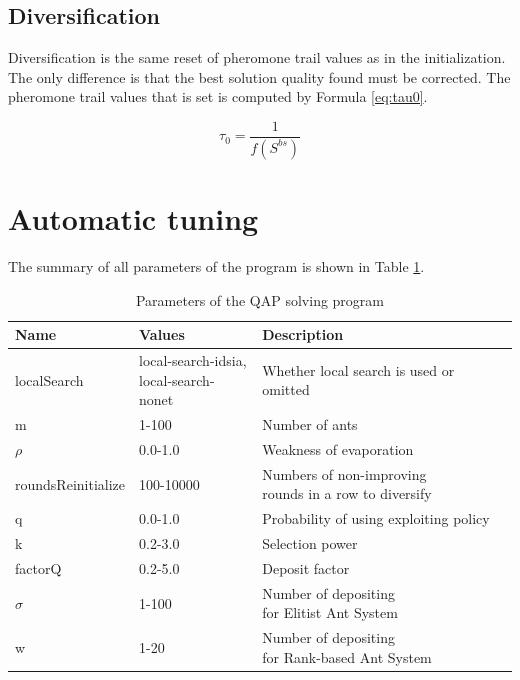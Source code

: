 \documentclass[12pt]{article}
\begin{document}
\subsection{Diversification}

Diversification is the same reset of pheromone trail values as in the initialization. The only difference is that the best solution quality found must be corrected. The pheromone trail values that is set is computed by Formula \ref{eq:tau0}.

\begin{equation}
\tau_0=\frac{1}{f(S^{bs})}
\label{eq:tau0}
\end{equation}

\section{Automatic tuning}

The summary of all parameters of the program is shown in Table \ref{tbl:parameters}.

\begin{table}[H]
\centering
\caption{Parameters of the QAP solving program}
\label{tbl:parameters}
\begin{tabular}{|l|l|l|}
\hline
\textbf{Name}         & \textbf{Values}                       & \textbf{Description}                                  \\ \hline
localSearch           & \makecell{local-search-idsia,\\ local-search-nonet} & Whether local search is used or omitted               \\ \hline
m                     & 1-100                                 & Number of ants                                        \\ \hline
$\rho$   & 0.0-1.0                               & Weakness of evaporation                               \\ \hline
roundsReinitialize    & 100-10000                             & \makecell[l]{Numbers of non-improving \\rounds in a row to diversify} \\ \hline
q                     & 0.0-1.0                               & Probability of using exploiting policy                \\ \hline
k                     & 0.2-3.0                               & Selection power                                       \\ \hline
factorQ               & 0.2-5.0                               & Deposit factor                                        \\ \hline
$\sigma$ & 1-100                                 & \makecell[l]{Number of depositing \\for Elitist Ant System}           \\ \hline
w                     & 1-20                                  & \makecell[l]{Number of depositing \\for Rank-based Ant System}        \\ \hline
\end{tabular}
\end{table}
\end{document}
